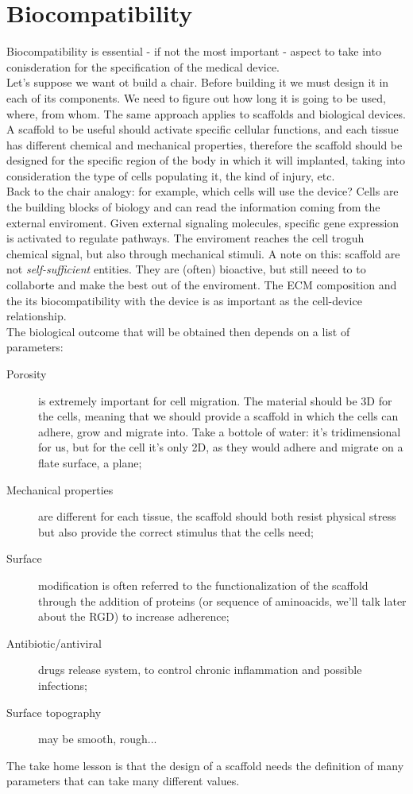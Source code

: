 \chapter{Biocompatibility}
Biocompatibility is essential - if not the most important - aspect to take into conisderation for the specification of the medical device. 
\\
Let's suppose we want ot build a chair. Before building it we must design it in each of its components. We need to figure out how long it is going to be used, where, from whom. The same approach applies to scaffolds and biological devices. A scaffold to be useful should activate specific cellular functions, and each tissue has different chemical and mechanical properties, therefore the scaffold should be designed for the specific region of the body in which it will implanted, taking into consideration the type of cells populating it, the kind of injury, etc.
\\
Back to the chair analogy: for example, which cells will use the device? Cells are the building blocks of biology and can read the information coming from the external enviroment. Given external signaling molecules, specific gene expression is activated to regulate pathways. The enviroment reaches the cell troguh chemical signal, but also through mechanical stimuli. A note on this: scaffold are not \textit{self-sufficient} entities. They are (often) bioactive, but still neeed to to collaborte and make the best out of the enviroment. The ECM composition and the its biocompatibility with the device is as important as the cell-device relationship. 
\\
The biological outcome that will be obtained then depends on a list of parameters:
\begin{description}
\item[Porosity] is extremely important for cell migration. The material should be 3D for the cells, meaning that we should provide a scaffold in which the cells can adhere, grow and migrate into. Take a bottole of water: it's tridimensional for us, but for the cell it's only 2D, as they would adhere and migrate on a flate surface, a plane;
\item[Mechanical properties] are different for each tissue, the scaffold should both resist physical stress but also provide the correct stimulus that the cells need;
\item[Surface] modification is often referred to the functionalization of the scaffold through the addition of proteins (or sequence of aminoacids, we'll talk later about the RGD) to increase adherence;
\item[Antibiotic/antiviral] drugs release system, to control chronic inflammation and possible infections;
\item[Surface topography] may be smooth, rough...
\end{description}
The take home lesson is that the design of a scaffold needs the definition of many parameters that can take many different values. 

